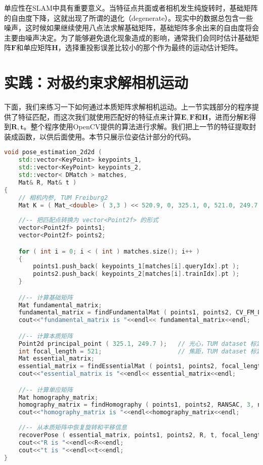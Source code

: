 单应性在SLAM中具有重要意义。当特征点共面或者相机发生纯旋转时，基础矩阵的自由度下降，这就出现了所谓的退化（degenerate）。现实中的数据总包含一些噪声，这时候如果继续使用八点法求解基础矩阵，基础矩阵多余出来的自由度将会主要由噪声决定。为了能够避免退化现象造成的影响，通常我们会同时估计基础矩阵$\bm{F}$和单应矩阵$\bm{H}$，选择重投影误差比较小的那个作为最终的运动估计矩阵。

\section{实践：对极约束求解相机运动}
下面，我们来练习一下如何通过本质矩阵求解相机运动。上一节实践部分的程序提供了特征匹配，而这次我们就使用匹配好的特征点来计算$\bm{E}, \bm{F}$和$\bm{H}$，进而分解$\bm{E}$得到$\bm{R}, \bm{t}$。整个程序使用OpenCV提供的算法进行求解。我们把上一节的特征提取封装成函数，以供后面使用。本节只展示位姿估计部分的代码。

\begin{lstlisting}[language=c++,caption=slambook/ch7/pose_estimation_2d2d.cpp （片段）]
void pose_estimation_2d2d ( 
	std::vector<KeyPoint> keypoints_1,
	std::vector<KeyPoint> keypoints_2,
	std::vector< DMatch > matches, 
	Mat& R, Mat& t )
{
	// 相机内参, TUM Freiburg2
	Mat K = ( Mat_<double> ( 3,3 ) << 520.9, 0, 325.1, 0, 521.0, 249.7, 0, 0, 1 );
	
	//-- 把匹配点转换为 vector<Point2f> 的形式
	vector<Point2f> points1;
	vector<Point2f> points2;

	for ( int i = 0; i < ( int ) matches.size(); i++ )
	{
		points1.push_back( keypoints_1[matches[i].queryIdx].pt );
		points2.push_back( keypoints_2[matches[i].trainIdx].pt );
	}

	//-- 计算基础矩阵
	Mat fundamental_matrix;
	fundamental_matrix = findFundamentalMat ( points1, points2, CV_FM_8POINT );
	cout<<"fundamental_matrix is "<<endl<< fundamental_matrix<<endl;

	//-- 计算本质矩阵
	Point2d principal_point ( 325.1, 249.7 );	// 光心，TUM dataset 标定值
	int focal_length = 521;						// 焦距，TUM dataset 标定值
	Mat essential_matrix;
	essential_matrix = findEssentialMat ( points1, points2, focal_length, principal_point, RANSAC );
	cout<<"essential_matrix is "<<endl<< essential_matrix<<endl;

	//-- 计算单应矩阵
	Mat homography_matrix;
	homography_matrix = findHomography ( points1, points2, RANSAC, 3, noArray(), 2000, 0.99 );
	cout<<"homography_matrix is "<<endl<<homography_matrix<<endl;
	
	//-- 从本质矩阵中恢复旋转和平移信息
	recoverPose ( essential_matrix, points1, points2, R, t, focal_length, principal_point );
	cout<<"R is "<<endl<<R<<endl;
	cout<<"t is "<<endl<<t<<endl;
}
\end{lstlisting}

